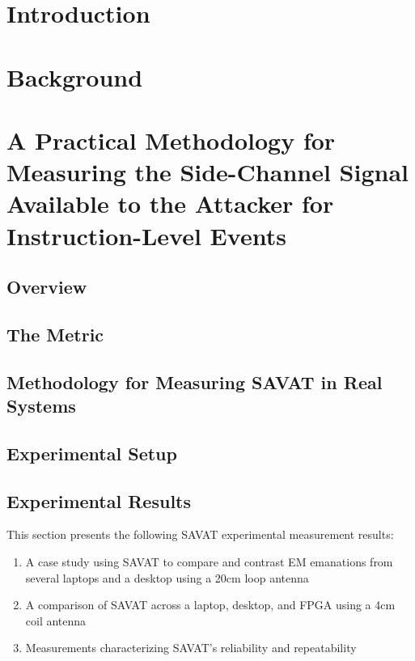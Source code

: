 \documentclass[12pt]{gatech-thesis}
\begin{document}
\chapter{Introduction}


\chapter{Background}
\label{sec:literature_survey}


\chapter{A Practical Methodology for Measuring the Side-Channel Signal Available to the Attacker for Instruction-Level Events}
\label{sec:savat}

\section{Overview}


\section{The \SAVAT Metric}
\label{savat-metric}


\section{Methodology for Measuring SAVAT in Real Systems}
\label{sec:methodology}


\section{Experimental Setup}
\label{sec:setup}


\section{Experimental Results}
This section presents the following SAVAT experimental measurement results:
\begin{enumerate}
\item A case study using SAVAT to compare and contrast EM emanations from several laptops and a desktop using a 20cm loop antenna
\item A comparison of SAVAT across a laptop, desktop, and FPGA using a 4cm coil antenna
\item Measurements characterizing SAVAT's reliability and repeatability
\end{enumerate}
\end{document}
